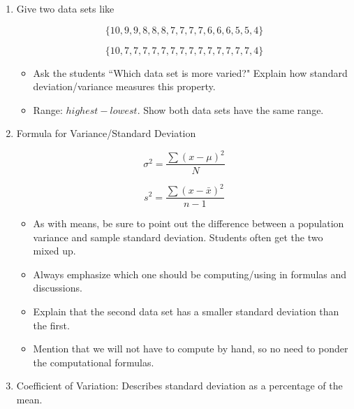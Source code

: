 \documentclass{article}
\begin{document}
\begin{enumerate}

    \item Give two data sets like

        $$\{10, 9, 9, 8, 8, 8, 7, 7, 7, 7, 6, 6, 6, 5, 5, 4\}$$

        $$\{10, 7, 7, 7, 7, 7, 7, 7, 7, 7, 7, 7, 7, 7, 7, 4\}$$
    \begin{itemize}
    
        \item Ask the students ``Which data set is more varied?" Explain how standard deviation/variance measures this property. 
        
        \item Range: $highest-lowest$. Show both data sets have the same range.
        
    \end{itemize}


    \item Formula for Variance/Standard Deviation
    
    $$\sigma^2 = \frac{ \sum (x-\mu)^2}{N}$$
    
    $$s^2 = \frac{ \sum (x-\bar{x})^2}{n-1}$$
    
        \begin{itemize}
        
            \item As with means, be sure to point out the difference between a population variance and sample standard deviation. Students often get the two mixed up.
            
            \item Always emphasize which one should be computing/using in formulas and discussions.
            
            \item Explain that the second data set has a smaller standard deviation than the first.
            
            \item Mention that we will not have to compute by hand, so no need to ponder the computational formulas.

        \end{itemize}

    \item Coefficient of Variation: Describes standard deviation as a percentage of the mean.
    
        \begin{itemize}
        

\end{itemize}
\end{enumerate}
\end{document}

